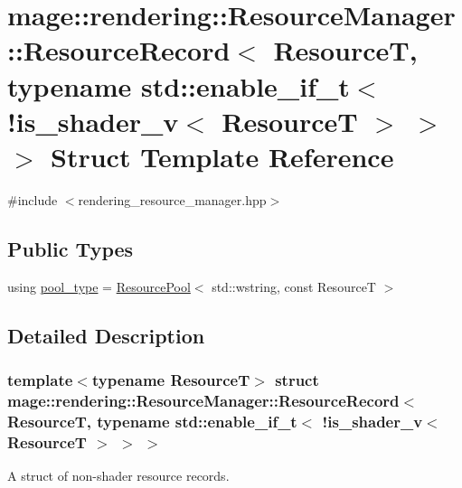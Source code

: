 \hypertarget{structmage_1_1rendering_1_1_resource_manager_1_1_resource_record_3_01_resource_t_00_01typename_0d1bec05cbaa53974b1eda0724091f851}{}\section{mage\+:\+:rendering\+:\+:Resource\+Manager\+:\+:Resource\+Record$<$ ResourceT, typename std\+:\+:enable\+\_\+if\+\_\+t$<$ !is\+\_\+shader\+\_\+v$<$ ResourceT $>$ $>$ $>$ Struct Template Reference}
\label{structmage_1_1rendering_1_1_resource_manager_1_1_resource_record_3_01_resource_t_00_01typename_0d1bec05cbaa53974b1eda0724091f851}


{\ttfamily \#include $<$rendering\+\_\+resource\+\_\+manager.\+hpp$>$}

\subsection*{Public Types}
\begin{DoxyCompactItemize}
\item 
using \mbox{\hyperlink{structmage_1_1rendering_1_1_resource_manager_1_1_resource_record_3_01_resource_t_00_01typename_0d1bec05cbaa53974b1eda0724091f851_a7c24663bbbfdf875688c2991f7fbac93}{pool\+\_\+type}} = \mbox{\hyperlink{classmage_1_1_resource_pool}{Resource\+Pool}}$<$ std\+::wstring, const ResourceT $>$
\end{DoxyCompactItemize}


\subsection{Detailed Description}
\subsubsection*{template$<$typename ResourceT$>$\newline
struct mage\+::rendering\+::\+Resource\+Manager\+::\+Resource\+Record$<$ Resource\+T, typename std\+::enable\+\_\+if\+\_\+t$<$ !is\+\_\+shader\+\_\+v$<$ Resource\+T $>$ $>$ $>$}

A struct of non-\/shader resource records.


